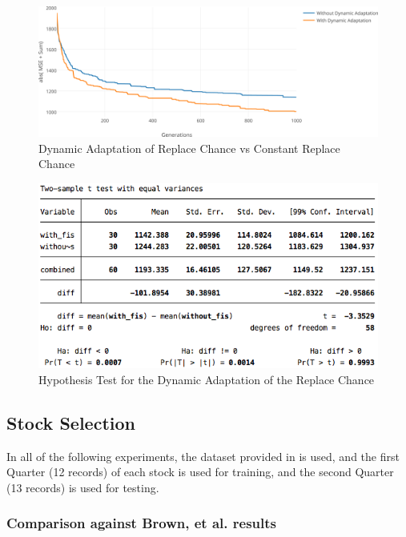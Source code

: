 \documentclass[12pt,journal,draftcls,onecolumn]{IEEEtran}
\begin{document}
\begin{figure}[h!]
\caption{Dynamic Adaptation of Replace Chance vs Constant Replace
  Chance}
\label{with-vs-without-dynamic}
\begin{center}
\includegraphics[width=1\columnwidth]{figures/fis-vs-no-fis/fis-vs-no-fis.png}
\end{center}
\end{figure}

\begin{figure}[h!]
\caption{Hypothesis Test for the Dynamic Adaptation of the Replace
  Chance}
\label{dynamic-hypothesis-test}
\begin{center}
\includegraphics[width=0.7\columnwidth]{figures/dynamic-parameter-statistical-test/dynamic-parameter-statistical-test.png}
\end{center}
\end{figure}

\clearpage

\subsection{Stock Selection}

In all of the following experiments, the dataset provided in \cite{brown2013dynamic} is used, and the first Quarter (12 records) of each stock is used for training, and the second Quarter (13 records) is used for testing.

\subsubsection{Comparison against Brown, et al. results}
\end{document}
